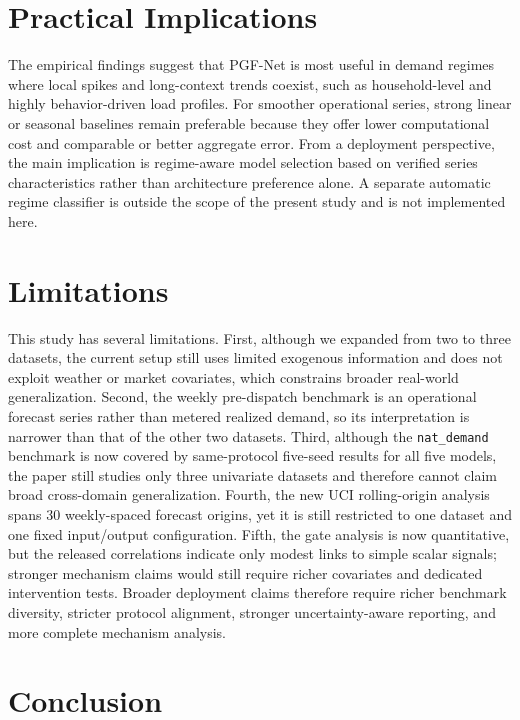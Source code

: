 \documentclass[pdflatex,sn-mathphys-num]{sn-jnl}
\theoremstyle{thmstyleone}
\theoremstyle{thmstyletwo}
\theoremstyle{thmstylethree}
\begin{document}
\FloatBarrier
\section{Practical Implications}

The empirical findings suggest that PGF-Net is most useful in demand regimes where local spikes and long-context trends coexist, such as household-level and highly behavior-driven load profiles. For smoother operational series, strong linear or seasonal baselines remain preferable because they offer lower computational cost and comparable or better aggregate error. From a deployment perspective, the main implication is regime-aware model selection based on verified series characteristics rather than architecture preference alone. A separate automatic regime classifier is outside the scope of the present study and is not implemented here.

\section{Limitations}

This study has several limitations. First, although we expanded from two to three datasets, the current setup still uses limited exogenous information and does not exploit weather or market covariates, which constrains broader real-world generalization. Second, the weekly pre-dispatch benchmark is an operational forecast series rather than metered realized demand, so its interpretation is narrower than that of the other two datasets. Third, although the \texttt{nat\_demand} benchmark is now covered by same-protocol five-seed results for all five models, the paper still studies only three univariate datasets and therefore cannot claim broad cross-domain generalization. Fourth, the new UCI rolling-origin analysis spans 30 weekly-spaced forecast origins, yet it is still restricted to one dataset and one fixed input/output configuration. Fifth, the gate analysis is now quantitative, but the released correlations indicate only modest links to simple scalar signals; stronger mechanism claims would still require richer covariates and dedicated intervention tests. Broader deployment claims therefore require richer benchmark diversity, stricter protocol alignment, stronger uncertainty-aware reporting, and more complete mechanism analysis.\cite{benidis2021deeplearning}

\section{Conclusion}
\end{document}
